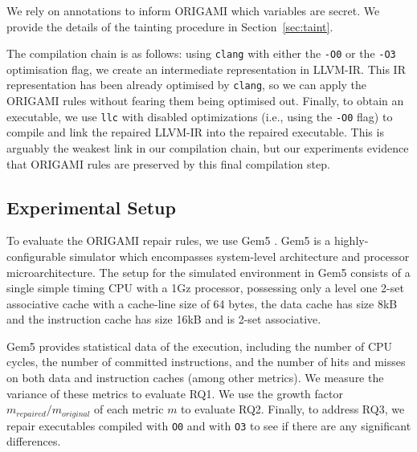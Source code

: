 {We rely on annotations to inform ORIGAMI which variables are secret. We provide the details of the tainting procedure in Section~\ref{sec:taint}. 

The compilation chain is as follows: using \texttt{clang} with either the \texttt{-\texttt{O0}} or the \texttt{-\texttt{O3}} optimisation flag, we create an intermediate representation in LLVM-IR. This IR representation has been already optimised by \texttt{clang}, so we can apply the ORIGAMI rules without fearing them being optimised out. Finally, to obtain an executable, we use \texttt{llc} with disabled optimizations (i.e., using the \texttt{-\texttt{O0}} flag) to compile and link the repaired LLVM-IR into the repaired executable. This is arguably the weakest link in our compilation chain, but our experiments evidence that ORIGAMI rules are preserved by this final compilation step.

\subsection{Experimental Setup}
To evaluate the ORIGAMI repair rules, we use Gem5 \cite{gem5}. Gem5 is a highly-configurable simulator which encompasses system-level architecture and processor microarchitecture. The setup for the simulated environment in Gem5 consists of a single simple timing CPU with a 1Gz processor, possessing only a level one 2-set associative cache with a cache-line size of 64 bytes, the data cache has size 8kB and the instruction cache has size 16kB and is 2-set associative.

Gem5 provides statistical data of the execution, including the number of CPU cycles, the number of committed instructions, and the number of hits and misses on both data and instruction caches (among other metrics). We measure the variance of these metrics to evaluate RQ1. We use the growth factor $m_{repaired}/m_{original}$ of each metric $m$ to evaluate RQ2. Finally, to address RQ3, we repair executables compiled with \texttt{O0} and with \texttt{O3} to see if there are any significant differences.

}
